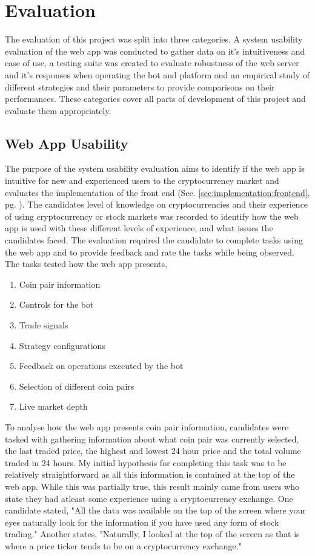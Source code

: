 %
\chapter{Evaluation}
\label{sec:evaluation}

The evaluation of this project was split into three categories. A system usability evaluation of the web app was conducted to gather data on it's intuitiveness and ease of use, a testing suite was created to evaluate robustness of the web server and it's responses when operating the bot and platform and an empirical study of different strategies and their parameters to provide comparisons on their performances. These categories cover all parts of development of this project and evaluate them appropriately.


\section{Web App Usability}
\label{sec:evaluation:ui}
\noindent The purpose of the system usability evaluation aims to identify if the web app is intuitive for new and experienced users to the cryptocurrency market and evaluates the implementation of the front end (Sec. \ref{sec:implementation:frontend}, pg. \pageref{sec:implementation:frontend}). The candidates level of knowledge on cryptocurrencies and their experience of using cryptocurrency or stock markets was recorded to identify how the web app is used with these different levels of experience, and what issues the candidates faced. The evaluation required the candidate to complete tasks using the web app and to provide feedback and rate the tasks while being observed. The tasks tested how the web app presents,
\begin{enumerate}
\item Coin pair information
\item Controls for the bot
\item Trade signals 
\item Strategy configurations
\item Feedback on operations executed by the bot
\item Selection of different coin pairs
\item Live market depth
\end{enumerate}


\noindent To analyse how the web app presents coin pair information, candidates were tasked with gathering information about what coin pair was currently selected, the last traded price, the highest and lowest 24 hour price and the total volume traded in 24 hours. My initial hypothesis for completing this task was to be relatively straightforward as all this information is contained at the top of the web app. While this was partially true, this result mainly came from users who state they had atleast some experience using a cryptocurrency exchange. One candidate stated, "All the data was available on the top of the screen where your eyes naturally look for the information if you have used any form of stock trading." Another states, "Naturally, I looked at the top of the screen as that is where a price ticker tends to be on a cryptocurrency exchange."

